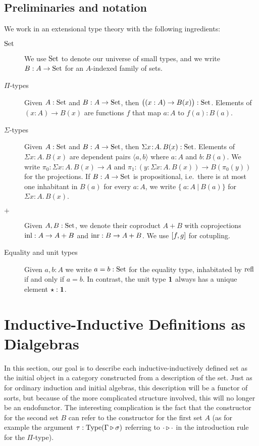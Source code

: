 \documentclass[orivec,envcountsame, ,envcountsect]{llncs}
\begin{document}
\subsection{Preliminaries and notation}

We work in an extensional type theory \cite{NPS1990book} with the
following ingredients:
\begin{description}
\item[$\text{Set}$] We use $\text{Set}$ to denote our universe of small types, and
  we write $B : A \to \text{Set}$ for an $A$-indexed family of sets.
\item[$\Pi$-types] Given $A : \text{Set}$ and $B : A \to \text{Set}$, then $\big((x :
  A) \to B(x)\big) : \text{Set}$.  Elements of $(x : A) \to B(x)$ are
  functions $f$ that map $a : A$ to $f(a) : B(a)$.
\item[$\Sigma$-types] Given $A : \text{Set}$ and $B : A \to \text{Set}$, then
  $\Sigma x\!:\!A.\, B(x) : \text{Set}$. Elements of $\Sigma x\!:\!A.\,
  B(x)$ are dependent pairs $\langle a, b\rangle$ where $a : A$ and $b : B(a)$.
  We write $\pi_0 : \Sigma x\!:\!A.\, B(x) \to A$ and $\pi_1 : (y :
  \Sigma x\!:\!A.\, B(x)) \to B(\pi_0(y))$ for the projections.  If $B
  : A \to \text{Set}$ is propositional, i.e.\ there is at most one
  inhabitant in $B(a)$ for every $a : A$, we write $\{\ a : A\ |\
  B(a)\}$ for $\Sigma x\!:\!A.\, B(x)$.
\item[$+$] Given $A, B : \text{Set}$, we denote their coproduct $A + B$ with
  coprojections $\text{inl} : A \to A + B$ and $\text{inr} : B \to A + B$. We
  use $[f, g]$ for cotupling.
\item[Equality and unit types] Given $a, b : A$ we write $a = b :
  \text{Set}$ for the equality type, inhabitated by $\text{refl}$ if and only if
  $a = b$. In contrast, the unit type $\mathbf{1}$
always has a unique element  $\star : \mathbf{1}$.
\end{description}


\section{Inductive-Inductive Definitions as Dialgebras}
\label{sec:indind-as-dialg}

In this section, our goal is to describe each inductive-inductively
defined set as the initial object in a category constructed from a
description of the set. Just as for ordinary induction and initial
algebras, this description will be a functor of sorts, but because of
the more complicated structure involved, this will no longer be an
endofunctor.
The interesting complication is the fact that the
constructor for the second set $B$ can refer to the constructor for
the first set $A$ (as for example the argument $\tau :
\text{Type}(\Gamma \triangleright \sigma)$ referring to
$\cdot \triangleright \cdot$ in the introduction rule for the
$\Pi$-type). 
\end{document}

